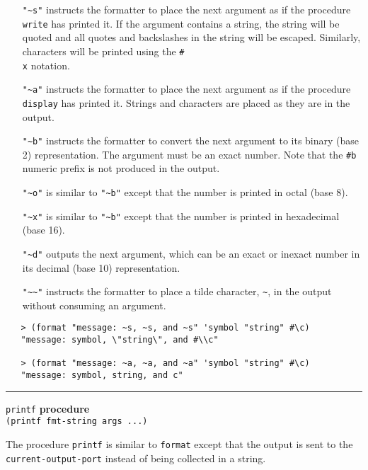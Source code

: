 \documentclass[onecolumn, 12pt, twoside, openright, dvipdfm]{book}
\makeatletter
\newcommand{\idxdefun}[3]{
\vspace{1ex}
\rule{\textwidth}{2pt}
{\index{#1@\texttt{#2}}\label{#1}{\Large\texttt{#2}} \hfill \textbf{#3}}\\
}
\newcommand{\defun}[2]{\idxdefun{#1}{#1}{#2}}
\makeatother
\begin{document}
\begin{itemize}

\item[\texttt{"\~{}s"}] instructs the formatter to place the next argument
as if the procedure \texttt{write} has printed it.  If the argument
contains a string, the string will be quoted and all quotes and
backslashes in the string will be escaped.  Similarly, characters
will be printed using the \texttt{\#\\x} notation.

\item[\texttt{"\~{}a"}] instructs the formatter to place the next argument
as if the procedure \texttt{display} has printed it.  Strings and
characters are placed as they are in the output.

\item[\texttt{"\~{}b"}] instructs the formatter to convert the next
argument to its binary (base 2) representation.  The argument must be an
exact number.  Note that the \texttt{\#b} numeric prefix is not
produced in the output.

\item[\texttt{"\~{}o"}] is similar to \texttt{"\~{}b"} except that
the number is printed in octal (base 8).

\item[\texttt{"\~{}x"}] is similar to \texttt{"\~{}b"} except that
the number is printed in hexadecimal (base 16).

\item[\texttt{"\~{}d"}] outputs the next argument, which can be an
exact or inexact number in its decimal (base 10) representation.

\item[\texttt{"\~{}\~{}"}] instructs the formatter to place a tilde
character, \texttt{\~{}}, in the output without consuming an
argument.

\end{itemize}

\begin{verbatim}
   > (format "message: ~s, ~s, and ~s" 'symbol "string" #\c)
   "message: symbol, \"string\", and #\\c"

   > (format "message: ~a, ~a, and ~a" 'symbol "string" #\c)
   "message: symbol, string, and c"
\end{verbatim}

\defun{printf}{procedure}
\texttt{(printf fmt-string args ...)}

The procedure \texttt{printf} is similar to \texttt{format} except
that the output is sent to the \texttt{current-output-port} instead
of being collected in a string.
\end{document}
